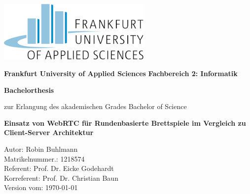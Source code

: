 \thispagestyle{empty}
\begin{center}

\includegraphics[height=3cm]{bilder/frauaslogo.png}
\begin{figure}[h!]
\centering
\end{figure}%

\begin{Large}
\textsf{\textbf{Frankfurt University of Applied Sciences}}
\textsf{\textbf{Fachbereich 2: Informatik}}\\[2cm]
\end{Large}


\begin{LARGE}
\textsf{\textbf{Bachelorthesis}}\\
\end{LARGE}
\textsf{zur Erlangung des akademischen Grades Bachelor of Science}\\[1cm]

\begin{Large}
\textsf{\textbf{Einsatz von WebRTC für Rundenbasierte Brettspiele im Vergleich zu Client-Server Architektur}}\\[3,5cm]
\end{Large}
\end{center}

\begin{large}
\textsf{Autor: Robin Buhlmann}\\[0,1cm]
\textsf{Matrikelnummer.: 1218574}\\[0,1cm]
\textsf{Referent: Prof. Dr. Eicke Godehardt}\\[0,1cm]
\textsf{Korreferent: Prof. Dr. Christian Baun}\\[0,1cm]

\textsf{Version vom: \today}
\end{large}
